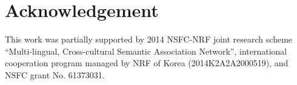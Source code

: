 \documentclass[letterpaper]{article}
\begin{document}
\section*{Acknowledgement}
This work was partially supported by 2014 NSFC-NRF joint research scheme
``Multi-lingual, Cross-cultural Semantic Association Network'', international cooperation program managed by NRF of Korea
(2014K2A2A2000519),  and
NSFC grant No. 61373031.



\end{document}
